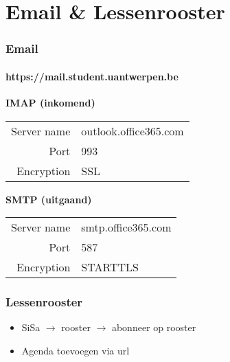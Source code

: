    \section{Email \& Lessenrooster}
	\begin{frame}
		\frametitle{Email}
		\framesubtitle{https://mail.student.uantwerpen.be}
        \begin{center}
        \end{center}
    	\textbf{IMAP (inkomend)}
        \begin{tabularx}{\linewidth}{rX}
          Server name & outlook.office365.com \\
          Port & 993 \\
          Encryption & SSL \\
		\end{tabularx} \vspace{0.5cm}
        
		\textbf{SMTP (uitgaand)}
        \begin{tabularx}{\linewidth}{rX}
          Server name & smtp.office365.com \\
          Port & 587 \\
          Encryption & STARTTLS \\
		\end{tabularx} \vspace{0.5cm}

        
	\end{frame}
    
	\begin{frame}
		\frametitle{Lessenrooster}
        \begin{itemize}
       	  \item SiSa $\rightarrow$ rooster $\rightarrow$ abonneer op rooster
          \item Agenda toevoegen via url
        \end{itemize}
	\end{frame}
    
